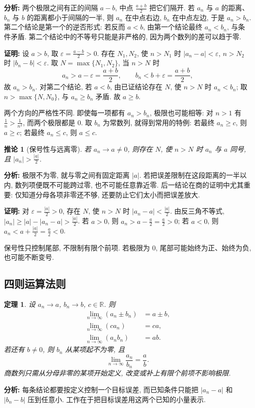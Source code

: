 \documentclass[UTF8,openany]{ctexbook}
\theoremstyle{chinesetextbook}
\newtheorem{theorem}{定理}[section]
\newenvironment{cnproof}{\par\indent\textbf{证明:} \ignorespaces}{\par}
\newtheorem*{corollarysingle}{推论}
\begin{document}
\par\indent\textbf{分析:} 两个极限之间有正的间隔 $a-b$, 中点 $\displaystyle\frac{a+b}2$ 把它们隔开. 若 $a_n$ 与 $a$ 的距离、$b_n$ 与 $b$ 的距离都小于间隔的一半, 则 $a_n$ 在中点右边, $b_n$ 在中点左边, 于是 $a_n>b_n$. 第二个结论是第一个的逆否形式: 若反而 $a<b$, 由第一个结论最终 $a_n<b_n$, 与条件矛盾. 第二个结论中的不等号只能是非严格的, 因为两个数列的差可以趋于零.
\begin{cnproof}
设 $a>b$, 取 $\displaystyle\varepsilon=\frac{a-b}2>0$. 存在 $N_1,N_2$, 使 $n>N_1$ 时 $|a_n-a|<\varepsilon$, $n>N_2$ 时 $|b_n-b|<\varepsilon$. 取 $N=\max\{N_1,N_2\}$, 当 $n>N$ 时
\[
a_n>a-\varepsilon=\frac{a+b}2,\qquad
b_n<b+\varepsilon=\frac{a+b}2,
\]
故 $a_n>b_n$. 对第二个结论, 若 $a<b$, 由已证结论存在 $N$, 使 $n>N$ 时 $a_n<b_n$; 取 $n>\max\{N,N_0\}$, 与 $a_n\ge b_n$ 矛盾. 故 $a\ge b$.
\end{cnproof}
两个方向的严格性不同. 即使每一项都有 $a_n>b_n$, 极限也可能相等: 对 $n>1$ 有 $\displaystyle\frac1n>\frac1{n^2}$, 而两个极限都是 $0$. 取 $b_n$ 为常数列, 就得到常用的特例: 若最终 $a_n\ge c$, 则 $a\ge c$; 若最终 $a_n\le c$, 则 $a\le c$.
\begin{corollarysingle}[保号性与远离零]
若 $a_n\to a\ne0$, 则存在 $N$, 使 $n>N$ 时 $a_n$ 与 $a$ 同号, 且 $\displaystyle|a_n|>\frac{|a|}2$.
\end{corollarysingle}
\par\indent\textbf{分析:} 极限不为零, 就与零之间有固定距离 $|a|$. 若把误差限制在这段距离的一半以内, 数列项便既不可能跨过零, 也不可能任意靠近零. 后一结论在商的证明中尤其重要: 仅知道分母各项非零还不够, 还要防止它们太小而把误差放大.
\begin{cnproof}
对 $\displaystyle\varepsilon=\frac{|a|}2>0$, 存在 $N$, 使 $n>N$ 时 $\displaystyle|a_n-a|<\frac{|a|}2$. 由反三角不等式, $\displaystyle|a_n|\ge|a|-|a_n-a|>\frac{|a|}2$. 若 $a>0$, 则 $\displaystyle a_n>a-\frac a2=\frac a2>0$; 若 $a<0$, 则 $\displaystyle a_n<a+\frac{|a|}2=\frac a2<0$.
\end{cnproof}
保号性只控制尾部, 不限制有限个前项. 若极限为 $0$, 尾部可能始终为正、始终为负, 也可能不断变号.
\subsection{四则运算法则}
\begin{theorem}
设 $a_n\to a$, $b_n\to b$, $c\in\mathbb R$. 则
\[
\begin{aligned}
\lim_{n\to\infty}(a_n\pm b_n)&=a\pm b,\\
\lim_{n\to\infty}(ca_n)&=ca,\\
\lim_{n\to\infty}(a_nb_n)&=ab.
\end{aligned}
\]
若还有 $b\ne0$, 则 $b_n$ 从某项起不为零, 且
\[
\lim_{n\to\infty}\frac{a_n}{b_n}=\frac ab.
\]
商数列只需从分母非零的某项开始定义, 改变或补上有限个前项不影响极限.
\end{theorem}
\par\indent\textbf{分析:} 每条结论都要按定义控制一个目标误差, 而已知条件只能把 $|a_n-a|$ 和 $|b_n-b|$ 压到任意小. 工作在于把目标误差用这两个已知的小量表示.
\end{document}
